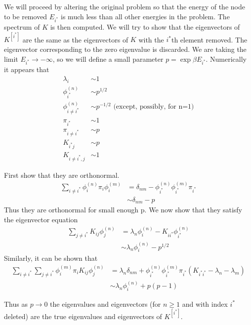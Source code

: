 \documentclass[a4paper]{article}
\newcommand{\evec}[2]{\phi^{(#2)}_{#1}}
\newcommand{\subK}{K^{[i^{*}]}}
\begin{document}
We will proceed by altering the original problem so that the energy of the node to be removed $E_{i^{*}}$
is much less than all other energies in the problem.  The spectrum of $K$ is then computed.
We will try to show that the eigenvectors of $\subK{}$ are the same as the eigenvectors of $K$ with 
the $i^{*}$th element removed. The eigenvector corresponding to the zero eigenvalue is discarded.
We are taking the limit $E_{i^{*}} \to -\infty$, so we will define a small parameter $p = \exp{\beta E_{i^{*}}}$.
Numerically it appears that
\begin{align}
\lambda_{i} &\sim 1 \\
\evec{i^{*}}{n} &\sim p^{1/2} \\
\evec{i\ne i^{*}}{n} &\sim p^{-1/2} \text{  (except, possibly, for n=1)} \\
\pi_{i^{*}} &\sim 1 \\
\pi_{i\ne i^{*}} &\sim p \\
K_{i^{*} j} &\sim p \\
K_{i\ne i^{*}, j} &\sim 1
\end{align}

First show that they are orthonormal.
\begin{align}
\sum_{i\ne i^{*}} \evec{i}{n} \pi_i \evec{i}{m} &= \delta_{nm} - \evec{i^{*}}{n} \evec{i^{*}}{m} \pi_{i^{*}} \\
& \sim \delta_{nm} - p
\end{align}
Thus they are orthonormal for small enough p.  We now show that they satisfy the eigenvector equation
\begin{align}
\sum_{j\ne i^{*}} K_{ij} \evec{j}{n}  &=
\lambda_n \evec{i}{n} - K_{i i^{*}} \evec{i^{*}}{n} \\
& \sim \lambda_n \evec{i}{n} - p^{1/2}
\end{align}
Similarly, it can be shown that
\begin{align}
\sum_{i\ne i^{*}} 
\sum_{j\ne i^{*}} 
\evec{i}{m} \pi_{i}
K_{ij} \evec{j}{n} 
&= \lambda_n \delta_{nm} + \evec{i^{*}}{n} \evec{i^{*}}{m} \pi_{i^{*}} (K_{i^{*} i^{*}} - \lambda_n - \lambda_m)
\\
& \sim \lambda_n \evec{i}{n} + p (p - 1)
\end{align}

Thus as $p \to 0$ the eigenvalues and eigenvectors (for $n \ge 1$ and with index $i^{*}$ deleted) are the true
eigenvalues and eigenvectors of $\subK{}$.
\end{document}
